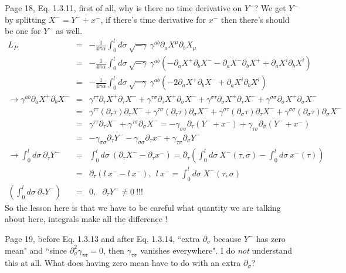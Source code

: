\documentclass[aps,preprint,preprintnumbers,nofootinbib,showpacs,prd]{revtex4-1}
\newcommand{\nbea}{\begin{eqnarray*}}
\newcommand{\neea}{\end{eqnarray*}}
\begin{document}
Page 18, Eq. 1.3.11, first of all, why is there no time derivative on $Y^{-}$? We get $Y^{-}$ by splitting $X^{-} = Y^{-} + x^{-}$, if there's time derivative for $x^{-}$ then there's should be one for $Y^{-}$ as well.
%
\nbea
L_P & = & -\frac{1}{4\pi\alpha} \int_0^l d\sigma~ \sqrt{-\gamma}~\gamma^{ab} \partial_a X^\mu \partial_b X_\mu \\
& = & -\frac{1}{4\pi\alpha} \int_0^l d\sigma~ \sqrt{-\gamma}~\gamma^{ab} \left ( - \partial_a X^+ \partial_b X^- - \partial_a X^- \partial_b X^+ +\partial_a X^i \partial_b X^i \right ) \\
& = & -\frac{1}{4\pi\alpha} \int_0^l d\sigma~ \sqrt{-\gamma}~\gamma^{ab} \left ( - 2 \partial_a X^+ \partial_b X^- +\partial_a X^i \partial_b X^i \right ) \\
\rightarrow \gamma^{ab} \partial_a X^+ \partial_b X^- & = & \gamma^{\tau\tau} \partial_\tau X^+ \partial_\tau X^- + \gamma^{\tau\sigma} \partial_\tau X^+ \partial_\sigma X^- + \gamma^{\sigma\tau} \partial_\sigma X^+ \partial_\tau X^- + \gamma^{\sigma\sigma} \partial_\sigma X^+ \partial_\sigma X^- \\
& = & \gamma^{\tau\tau} (\partial_\tau \tau) \partial_\tau X^- + \gamma^{\tau\sigma} (\partial_\tau \tau) \partial_\sigma X^- + \gamma^{\sigma\tau} (\partial_\sigma \tau) \partial_\tau X^- + \gamma^{\sigma\sigma} (\partial_\sigma \tau) \partial_\sigma X^- \\
& = & \gamma^{\tau\tau} \partial_\tau X^- + \gamma^{\tau\sigma} \partial_\sigma X^- = -\gamma_{\sigma\sigma} \partial_\tau (Y^- + x^-) + \gamma_{\tau\sigma} \partial_\sigma(Y^- + x^-) \\
& = & -\gamma_{\sigma\sigma} \partial_\tau Y^- -\gamma_{\sigma\sigma} \partial_\tau x^- + \gamma_{\tau\sigma} \partial_\sigma Y^- \\
\rightarrow \int_0^l d\sigma ~ \partial_\tau Y^- & = & \int_0^l d\sigma ~ (\partial_\tau X^- - \partial_\tau x^-) = \partial_\tau \left ( \int_0^l d\sigma ~ X^-(\tau,\sigma) - \int_0^l d\sigma ~ x^-(\tau) \right ) \\
& = & \partial_\tau \left ( l ~ x^- - l ~ x^- \right ),~~ l~x^- = \int_0^l d\sigma ~ X^-(\tau,\sigma) \\
\left ( \int_0^l d\sigma ~ \partial_\tau Y^- \right ) & = & 0, ~~~ \partial_\tau Y^- \neq 0 ~ !!!
\neea
%
So the lesson here is that we have to be careful what quantity we are talking about here, integrals make all the difference !

Page 19, before Eq. 1.3.13 and after Eq. 1.3.14, ``extra $\partial_\sigma$ because $Y^{-}$ has zero mean" and ``since $\partial^2_\sigma \gamma_{\tau\sigma} = 0$, then $\gamma_{\tau\sigma}$ vanishes everywhere". I do {\it not} understand this at all. What does having zero mean have to do with an extra $\partial_\sigma$?
\end{document}
